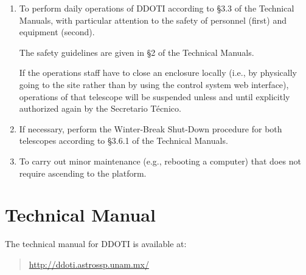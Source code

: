 \documentclass{article}
\begin{document}
\begin{enumerate}

%

\item
To perform daily operations of DDOTI according to \S3.3 of the Technical Manuals, with particular attention to the safety of personnel (first) and equipment (second). 

The safety guidelines are given in \S2 of the Technical Manuals.

If the operations staff have to close an enclosure locally (i.e., by physically going to the site rather than by using the control system web interface), operations of that telescope will be suspended unless and until explicitly authorized again by the Secretario Técnico.
\item
If necessary, perform the Winter-Break Shut-Down procedure for both telescopes according to \S3.6.1 of the Technical Manuals. 



\item
To carry out minor maintenance (e.g., rebooting a computer) that does not require ascending to the platform.
\end{enumerate}

\section{Technical Manual}

The technical manual for DDOTI is available at:

\begin{quote}
\url{http://ddoti.astrossp.unam.mx/}
\end{quote}


\end{document}
